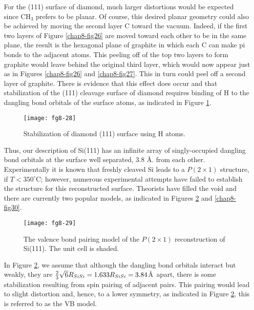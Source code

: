 For the (111) surface of diamond, much larger distortions would be
expected since CH$_3$ prefers to be planar.  Of course, this desired
planar geometry could also be achieved by moving the second layer C
toward the vacuum. Indeed, if the first two layers of Figure
\ref{chap8-fig26} are moved toward each other to be in the same plane,
the result is the hexagonal plane of graphite in which each C can make
pi bonds to the adjacent atoms. This peeling off of the top two layers
to form graphite would leave behind the original third layer, which
would now appear just as in Figures \ref{chap8-fig26} and
\ref{chap8-fig27}.  This in turn could peel off a second layer of
graphite. There is evidence that this effect does occur and that
stabilization of the (111) cleavage surface of diamond requires
binding of H to the dangling bond orbitals of the surface atoms, as
indicated in Figure \ref{chap8-fig28}.

\begin{figure}
\begin{center}
\texttt{[image: fg8-28]}
\end{center}
\caption{Stabilization of diamond (111) surface using H atoms.}
\label{chap8-fig28}
\end{figure}

Thus, our description of Si(111) has an infinite array of singly-occupied 
dangling bond orbitals at the surface well separated, 3.8 \AA. from each other. 
Experimentally it is known that freshly cleaved Si leads to a $P(2 
\times 1)$ structure, if $T < 350^{\circ}$C; however, numerous
experimental attempts have failed to establish the structure for this
reconstructed surface.  Theorists have filled the void and there are
currently two popular models, as indicated in Figures
\ref{chap8-fig29} and \ref{chap8-fig30}.


\begin{figure}
\begin{center}
\texttt{[image: fg8-29]}
\end{center}
\caption{The valence bond pairing model of the $P(2 \times 1)$
reconstruction of Si(111).  The unit cell is shaded.} 
\label{chap8-fig29}
\end{figure}

In Figure \ref{chap8-fig29}, we assume that although the dangling bond
orbitals interact but weakly, they are ${2 \over 3} \sqrt{6} R_{SiSi}
= 1.633 R_{SiSi} = 3.84$\AA\ apart, there is some stabilization
resulting from spin pairing of adjacent pairs.  This pairing would
lead to slight distortion and, hence, to a lower symmetry, as
indicated in Figure \ref{chap8-fig29}, this is referred to as the VB model.

